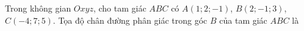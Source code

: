 \begin{ex}
Trong không gian $Oxyz$, cho tam giác $ABC$ có $A(1;2;-1)$, $B(2;-1;3)$, $C(-4;7;5)$. Tọa độ chân đường phân giác trong góc $B$ của tam giác $ABC$ là
\end{ex}
